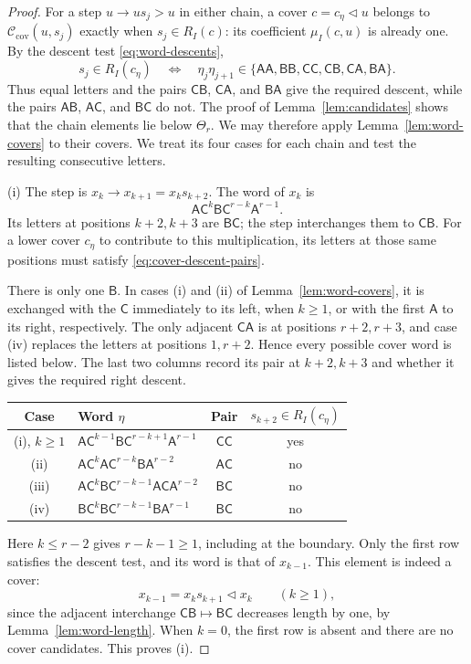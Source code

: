 \documentclass[11pt,a4paper,reqno]{amsart}
\numberwithin{equation}{section}
\theoremstyle{definition}
\theoremstyle{remark}
\theoremstyle{plain}
\newcommand{\A}{\mathsf A}
\newcommand{\B}{\mathsf B}
\newcommand{\CC}{\mathsf C}
\newcommand{\mus}{\mu_I}
\begin{document}
\begin{proof}
For a step $u\to us_j>u$ in either chain, a cover
$c=c_\eta\triangleleft u$ belongs to
$\mathcal C_{\mathrm{cov}}(u,s_j)$ exactly when $s_j\in R_I(c)$:
its coefficient $\mus(c,u)$ is already one.
By the descent test \eqref{eq:word-descents},
\begin{equation}\label{eq:cover-descent-pairs}
 s_j\in R_I(c_\eta)
 \quad\Longleftrightarrow\quad
 \eta_j\eta_{j+1}\in
 \{\A\A,\B\B,\CC\CC,\CC\B,\CC\A,\B\A\}.
\end{equation}
Thus equal letters and the pairs $\CC\B$, $\CC\A$, and $\B\A$
give the required descent, while the pairs $\A\B$, $\A\CC$, and $\B\CC$
do not. The proof of Lemma~\ref{lem:candidates} shows that the
chain elements lie below $\Theta_r$. We may therefore apply
Lemma~\ref{lem:word-covers} to their covers. We treat its four
cases for each chain and test the resulting consecutive letters.

\smallskip\noindent
\textup{(i)} The step is $x_k\to x_{k+1}=x_ks_{k+2}$.
The word of $x_k$ is
\[
 \A\CC^k\B\CC^{r-k}\A^{r-1}.
\]
Its letters at positions $k+2,k+3$ are $\B\CC$; the step
interchanges them to $\CC\B$. For a lower cover $c_\eta$ to
contribute to this multiplication, its letters at those same
positions must satisfy \eqref{eq:cover-descent-pairs}.

There is only one $\B$. In cases \textup{(i)} and \textup{(ii)}
of Lemma~\ref{lem:word-covers}, it is exchanged with the $\CC$
immediately to its left, when $k\geq1$, or with the first $\A$
to its right, respectively. The only adjacent $\CC\A$ is at
positions $r+2,r+3$, and case \textup{(iv)} replaces the letters
at positions $1,r+2$. Hence every possible cover word is listed
below. The last two columns record its pair at $k+2,k+3$ and
whether it gives the required right descent.
\begin{center}
\begin{tabular}{@{}clcc@{}}
\toprule
Case & Word $\eta$ & Pair & $s_{k+2}\in R_I(c_\eta)$ \\
\midrule
\textup{(i)}, $k\geq1$
 & $\A\CC^{k-1}\B\CC^{r-k+1}\A^{r-1}$ & $\CC\CC$ & yes \\
\textup{(ii)}
 & $\A\CC^k\A\CC^{r-k}\B\A^{r-2}$ & $\A\CC$ & no \\
\textup{(iii)}
 & $\A\CC^k\B\CC^{r-k-1}\A\CC\A^{r-2}$ & $\B\CC$ & no \\
\textup{(iv)}
 & $\B\CC^k\B\CC^{r-k-1}\B\A^{r-1}$ & $\B\CC$ & no \\
\bottomrule
\end{tabular}
\end{center}
Here $k\leq r-2$ gives $r-k-1\geq1$, including at the boundary.
Only the first row satisfies the descent test, and its word is
that of $x_{k-1}$. This element is indeed a cover:
\[
 x_{k-1}=x_ks_{k+1}\triangleleft x_k\qquad(k\geq1),
\]
since the adjacent interchange $\CC\B\mapsto\B\CC$ decreases
length by one, by Lemma~\ref{lem:word-length}.
When $k=0$, the first row is absent and there are no cover candidates.
This proves \textup{(i)}.


\end{proof}
\end{document}
